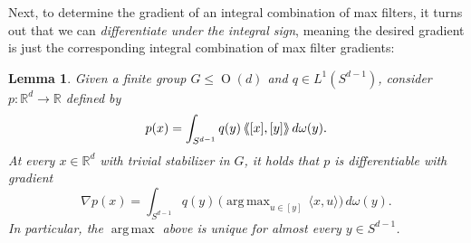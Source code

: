 \documentclass{article}
\theoremstyle{plain}
\newtheorem{lemma}[theorem]{Lemma}
\theoremstyle{definition}
\newcommand{\llangle}{\langle\hspace{-2.5pt}\langle}
\newcommand{\rrangle}{\rangle\hspace{-2.5pt}\rangle}
\DeclareMathOperator*{\argmax}{arg\,max}
\begin{document}
Next, to determine the gradient of an integral combination of max filters, it turns out that we can \textit{differentiate under the integral sign}, meaning the desired gradient is just the corresponding integral combination of max filter gradients:

\begin{lemma}
\label{lem.differentiation under the integral sign}
Given a finite group $G\leq\operatorname{O}(d)$ and $q\in L^1(S^{d-1})$, consider $p\colon\mathbb{R}^d\to\mathbb{R}$ defined by
\[
p(x)
=\int_{S^{d-1}}q(y)\,\llangle[x],[y]\rrangle\,d\omega(y).
\]
At every $x\in\mathbb{R}^d$ with trivial stabilizer in $G$, it holds that $p$ is differentiable with gradient
\[
\nabla p(x)
=\int_{S^{d-1}}q(y)\,\Big(\argmax_{u\in [y]}\,\langle x,u\rangle\Big)\,d\omega(y).
\]
In particular, the $\argmax$ above is unique for almost every $y\in S^{d-1}$.
\end{lemma}
\end{document}
